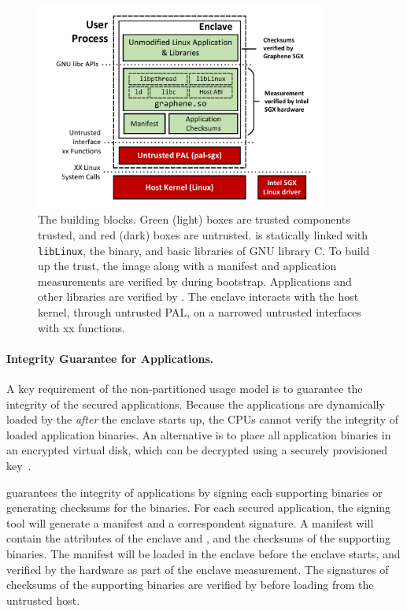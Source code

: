 \begin{figure}[t!]
\centering
\includegraphics[width=3.8in]{graphene-sgx/figures/architecture.pdf}
\footnotesize
\caption[\sysname{}: building blocks.]
{The \sysname{} building blocks.
Green (light) boxes are trusted components trusted,
and red (dark) boxes are untrusted.
\sysname{} is statically linked with {\tt libLinux},
the \libos{} binary, and basic libraries of GNU library C.
To build up the trust, the \sysname{} image along with
a manifest and application measurements
are verified by \sgx{} during bootstrap. Applications and other libraries
are verified by \sysname{}. The enclave interacts with the host kernel,
through untrusted PAL, on a narrowed untrusted interfaces with xx functions.}
\label{fig:gsgx:arch}
\end{figure}

\paragraph{Integrity Guarantee for Applications.}
A key requirement of the non-partitioned usage model is to guarantee the integrity of the secured applications.
Because the applications are dynamically loaded by the \libos{}
{\em after} the enclave starts up,
the CPUs cannot verify the integrity of loaded application binaries.
An alternative is to place all application binaries in an encrypted virtual disk,
which can be decrypted using a securely provisioned key~\citep{baumann14haven}.

\sysname{} guarantees the integrity of applications
by signing each supporting binaries or generating checksums for the binaries.
For each secured application, the \sysname{} signing tool will generate
a manifest and a correspondent signature.
A manifest will contain the attributes of the enclave and \libos{},
and the checksums of the supporting binaries.
The manifest will be loaded in the enclave before the enclave starts,
and verified by the hardware as part of the enclave measurement.
The signatures of checksums of the supporting binaries
are verified by \sysname{} before loading from the untrusted host.

